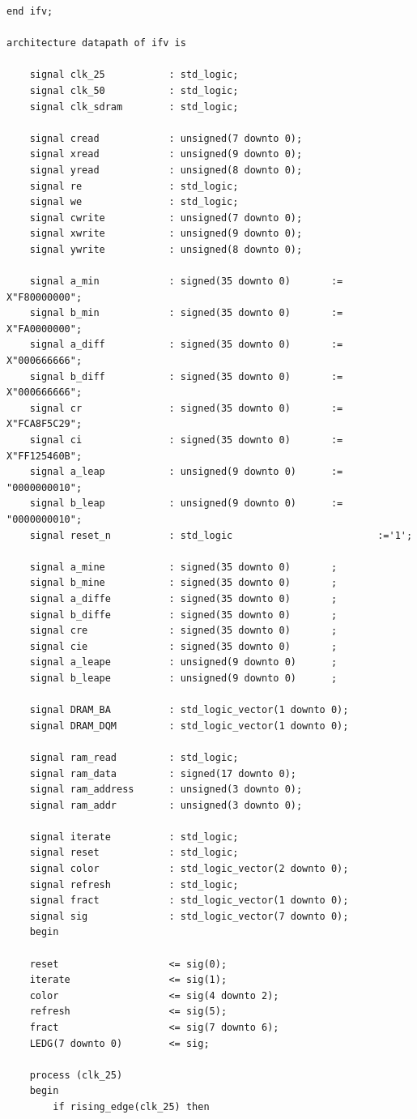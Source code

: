 \documentclass{article}
\begin{document}
\begin{lstlisting}
end ifv;

architecture datapath of ifv is

	signal clk_25			: std_logic;
	signal clk_50			: std_logic;
	signal clk_sdram		: std_logic;

	signal cread			: unsigned(7 downto 0);
	signal xread			: unsigned(9 downto 0);
	signal yread			: unsigned(8 downto 0);
	signal re				: std_logic;
	signal we				: std_logic;
	signal cwrite			: unsigned(7 downto 0);
	signal xwrite			: unsigned(9 downto 0);
	signal ywrite			: unsigned(8 downto 0);

	signal a_min			: signed(35 downto 0)		:= X"F80000000";
	signal b_min			: signed(35 downto 0)		:= X"FA0000000";
	signal a_diff			: signed(35 downto 0)		:= X"000666666";
	signal b_diff			: signed(35 downto 0)		:= X"000666666";
	signal cr   			: signed(35 downto 0)		:= X"FCA8F5C29";
	signal ci   			: signed(35 downto 0)		:= X"FF125460B";
	signal a_leap			: unsigned(9 downto 0)		:= "0000000010";
	signal b_leap			: unsigned(9 downto 0)		:= "0000000010";
	signal reset_n			: std_logic							:='1';

	signal a_mine			: signed(35 downto 0)		;
	signal b_mine			: signed(35 downto 0)		;
	signal a_diffe			: signed(35 downto 0)		;
	signal b_diffe			: signed(35 downto 0)		;
	signal cre   			: signed(35 downto 0)		;
	signal cie   			: signed(35 downto 0)		;
	signal a_leape			: unsigned(9 downto 0)		;
	signal b_leape			: unsigned(9 downto 0)		;

	signal DRAM_BA			: std_logic_vector(1 downto 0);
	signal DRAM_DQM			: std_logic_vector(1 downto 0);

	signal ram_read			: std_logic;
	signal ram_data			: signed(17 downto 0);
	signal ram_address		: unsigned(3 downto 0);
	signal ram_addr			: unsigned(3 downto 0);

	signal iterate			: std_logic;
	signal reset			: std_logic;
	signal color			: std_logic_vector(2 downto 0);
	signal refresh			: std_logic;
	signal fract			: std_logic_vector(1 downto 0);
	signal sig				: std_logic_vector(7 downto 0);
	begin

	reset					<= sig(0);
	iterate					<= sig(1);
	color					<= sig(4 downto 2);
	refresh					<= sig(5);
	fract					<= sig(7 downto 6);
	LEDG(7 downto 0)		<= sig;

	process (clk_25)
	begin
		if rising_edge(clk_25) then


\end{lstlisting}
\end{document}

